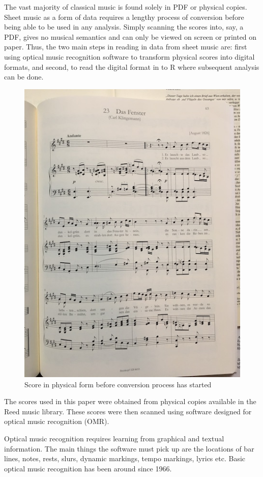 \documentclass[12pt,twoside]{reedthesis}
\theoremstyle{definition}
\theoremstyle{definition}
\theoremstyle{definition}
\theoremstyle{remark}
\begin{document}
The vast majority of classical music is found solely in PDF or physical
copies. Sheet music as a form of data requires a lengthy process of
conversion before being able to be used in any analysis. Simply scanning
the scores into, say, a PDF, gives no musical semantics and can only be
viewed on screen or printed on paper. Thus, the two main steps in
reading in data from sheet music are: first using optical music
recognition software to transform physical scores into digital formats,
and second, to read the digital format in to R where subsequent analysis
can be done.
\begin{figure}[h]
\centering
\includegraphics[scale=.50]{images/scorephoto.JPG}
\caption{Score in physical form before conversion process has started}
\label{subd}
\end{figure}
The scores used in this paper were obtained from physical copies
available in the Reed music library. These scores were then scanned
using software designed for optical music recognition (OMR).

Optical music recognition requires learning from graphical and textual
information. The main things the software must pick up are the locations
of bar lines, notes, rests, slurs, dynamic markings, tempo markings,
lyrics etc. Basic optical music recognition has been around since 1966.
\end{document}
